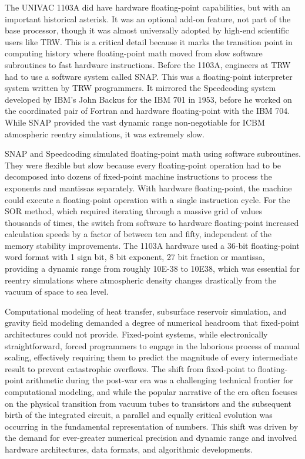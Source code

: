The UNIVAC 1103A did have hardware floating-point capabilities, but with an important historical asterisk. It was an optional add-on feature, not part of the base processor, though it was almost universally adopted by high-end scientific users like TRW. This is a critical detail because it marks the transition point in computing history where floating-point math moved from slow software subroutines to fast hardware instructions. Before the 1103A, engineers at TRW had to use a software system called SNAP. This was a floating-point interpreter system written by TRW programmers. It mirrored the Speedcoding system developed by IBM’s John Backus for the IBM 701 in 1953, before he worked on the coordinated pair of Fortran and hardware floating-point with the IBM 704. While SNAP provided the vast dynamic range non-negotiable for ICBM atmospheric reentry simulations, it was extremely slow.

SNAP and Speedcoding simulated floating-point math using software subroutines. They were flexible but slow because every floating-point operation had to be decomposed into dozens of fixed-point machine instructions to process the exponents and mantissas separately. With hardware floating-point, the machine could execute a floating-point operation with a single instruction cycle. For the SOR method, which required iterating through a massive grid of values thousands of times, the switch from software to hardware floating-point increased calculation speeds by a factor of between ten and fifty, independent of the memory stability improvements. The 1103A hardware used a 36-bit floating-point word format with 1 sign bit, 8 bit exponent, 27 bit fraction or mantissa, providing a dynamic range from roughly 10E-38 to 10E38, which was essential for reentry simulations where atmospheric density changes drastically from the vacuum of space to sea level. 

Computational modeling of heat transfer, subsurface reservoir simulation, and gravity field modeling demanded a degree of numerical headroom that fixed-point architectures could not provide. Fixed-point systems, while electronically straightforward, forced programmers to engage in the laborious process of manual scaling, effectively requiring them to predict the magnitude of every intermediate result to prevent catastrophic overflows. The shift from fixed-point to floating-point arithmetic during the post-war era was a challenging technical frontier for computational modeling, and while the popular narrative of the era often focuses on the physical transition from vacuum tubes to transistors and the subsequent birth of the integrated circuit, a parallel and equally critical evolution was occurring in the fundamental representation of numbers. This shift was driven by the demand for ever-greater numerical precision and dynamic range and involved hardware architectures, data formats, and algorithmic developments. 

